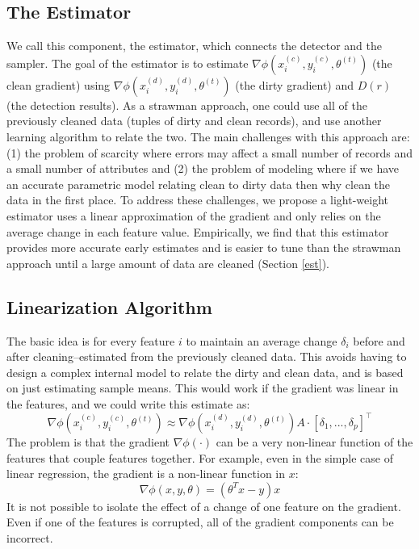 \subsection{The Estimator}\label{sampling}
We call this component, the estimator, which connects the detector and the sampler.
The goal of the estimator is to estimate $\nabla\phi(x^{(c)}_i,y^{(c)}_i,\theta^{(t)})$ (the clean gradient) using $\nabla\phi(x^{(d)}_i,y^{(d)}_i,\theta^{(t)})$ (the dirty gradient) and $D(r)$ (the detection results).
As a strawman approach, one could use all of the previously cleaned data (tuples of dirty and clean records), and use another learning algorithm to relate the two.
The main challenges with this approach are: (1) the problem of scarcity where errors may affect a small number of records and a small number of attributes and (2) the problem of modeling where if we have an accurate parametric model relating clean to dirty data then why clean the data in the first place. 
To address these challenges, we propose a light-weight estimator uses a linear approximation of the gradient and only relies on the average change in each feature value.
Empirically, we find that this estimator provides more accurate early estimates and is easier to tune than the strawman approach until a large amount of data are cleaned (Section \ref{est}).  
\subsection{Linearization Algorithm}
The basic idea is for every feature $i$ to maintain an average change $\delta_i$ before and after cleaning--estimated from the previously cleaned data.
This avoids having to design a complex internal model to relate the dirty and clean data, and is based on just estimating sample means.
This would work if the gradient was linear in the features, and we could write this estimate as:
\[
\nabla\phi(x^{(c)}_i,y^{(c)}_i,\theta^{(t)}) \approx \nabla\phi(x^{(d)}_i,y^{(d)}_i,\theta^{(t)}) A \cdot [\delta_1, ..., \delta_p]^{\intercal}
\]
The problem is that the gradient $\nabla\phi(\cdot)$ can be a very non-linear function of the features that couple features together.
For example, even in the simple case of linear regression, the gradient is a non-linear function in $x$:
\[
\nabla\phi(x,y,\theta) = (\theta^Tx - y)x
\]
It is not possible to isolate the effect of a change of one feature on the gradient.
Even if one of the features is corrupted, all of the gradient components can be incorrect.

